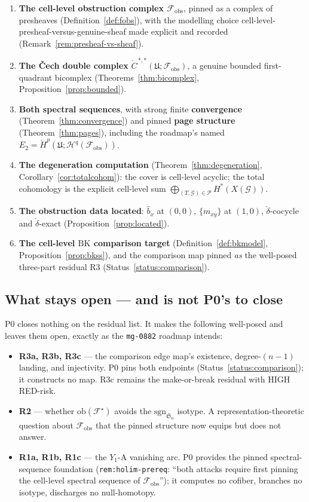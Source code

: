 \documentclass[11pt,oneside]{amsart}
\theoremstyle{plain}
\theoremstyle{definition}
\theoremstyle{remark}
\theoremstyle{honeststyle}
\newcommand{\F}{\mathcal{F}}
\newcommand{\G}{\mathcal{G}}
\newcommand{\Fstar}{\F^{\star}}
\newcommand{\sgn}{\mathrm{sgn}}
\newcommand{\Sym}{\mathfrak{S}}
\newcommand{\ob}{\mathrm{ob}}
\newcommand{\BK}{\mathrm{BK}}
\newcommand{\fobs}{\mathcal{F}_{\mathrm{obs}}}
\newcommand{\Pp}{\mathcal{P}}
\newcommand{\Uf}{\mathfrak{U}}
\newcommand{\Ccheck}{\check{C}}
\begin{document}
\begin{enumerate}[leftmargin=2.0em]
\item \textbf{The cell-level obstruction complex $\fobs$}, pinned as a
  complex of presheaves (Definition~\ref{def:fobs}), with the
  modelling choice cell-level-presheaf-versus-genuine-sheaf made
  explicit and recorded (Remark~\ref{rem:presheaf-vs-sheaf}).
\item \textbf{The \v{C}ech double complex} $\Ccheck^{\,*,*}(\Uf;
  \fobs)$, a genuine bounded first-quadrant bicomplex
  (Theorems~\ref{thm:bicomplex}, Proposition~\ref{prop:bounded}).
\item \textbf{Both spectral sequences}, with strong finite
  \textbf{convergence} (Theorem~\ref{thm:convergence}) and pinned
  \textbf{page structure} (Theorem~\ref{thm:pages}), including the
  roadmap's named $E_{2}=\check H^{p}(\Uf;\mathcal H^{q}(\fobs))$.
\item \textbf{The degeneration computation}
  (Theorem~\ref{thm:degeneration}, Corollary~\ref{cor:totalcohom}):
  the cover is cell-level acyclic; the total cohomology is the
  explicit cell-level sum $\bigoplus_{(T,\G)\in\Pp}H^{*}(X(\G))$.
\item \textbf{The obstruction data located}: $\widehat b_{x}$ at
  $(0,0)$, $\{m_{xy}\}$ at $(1,0)$, $\check\delta$-cocycle and
  $\check\delta$-exact (Proposition~\ref{prop:located}).
\item \textbf{The cell-level $\BK$ comparison target}
  (Definition~\ref{def:bkmodel}, Proposition~\ref{prop:bkss}), and the
  comparison map pinned \emph{as} the well-posed three-part residual
  R3 (Status~\ref{status:comparison}).
\end{enumerate}

\subsection{What stays open --- and is not P0's to close}
\label{ssec:open}

P0 closes nothing on the residual list. It makes the following
well-posed and leaves them open, exactly as the \texttt{mg-0882}
roadmap intends:

\begin{itemize}[leftmargin=1.7em]
\item \textbf{R3a, R3b, R3c} --- the comparison edge map's existence,
  degree-$(n-1)$ landing, and injectivity. P0 pins both endpoints
  (Status~\ref{status:comparison}); it constructs no map. R3c remains
  the make-or-break residual with HIGH RED-risk.
\item \textbf{R2} --- whether $\ob(\Fstar)$ avoids the $\sgn_{\Sym_{n}}$
  isotype. A representation-theoretic question about $\fobs$ that the
  pinned structure now equips but does not answer.
\item \textbf{R1a, R1b, R1c} --- the $Y_{1}$-A vanishing arc. P0
  provides the pinned spectral-sequence foundation
  (\texttt{rem:holim-prereq}: ``both attacks require first pinning the
  cell-level spectral sequence of $\fobs$''); it computes no cofiber,
  branches no isotype, discharges no null-homotopy.
\end{itemize}
\end{document}

